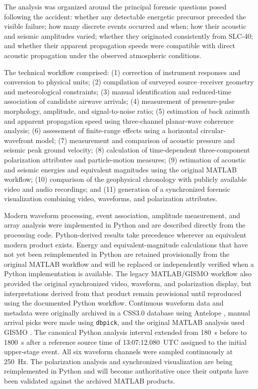 \documentclass[]{seismica}
\begin{document}
The analysis was organized around the principal forensic questions posed
following the accident: whether any detectable energetic precursor preceded
the visible failure; how many discrete events occurred and when; how their
acoustic and seismic amplitudes varied; whether they originated consistently
from SLC-40; and whether their apparent propagation speeds were compatible with
direct acoustic propagation under the observed atmospheric conditions.

The technical workflow comprised:
(1) correction of instrument responses and conversion to physical units;
(2) compilation of surveyed source--receiver geometry and meteorological
constraints;
(3) manual identification and reduced-time association of candidate airwave
arrivals;
(4) measurement of pressure-pulse morphology, amplitude, and signal-to-noise
ratio;
(5) estimation of back azimuth and apparent propagation speed using
three-channel planar-wave coherence analysis;
(6) assessment of finite-range effects using a horizontal circular-wavefront
model;
(7) measurement and comparison of acoustic pressure and seismic peak ground
velocity;
(8) calculation of time-dependent three-component polarization attributes and
particle-motion measures;
(9) estimation of acoustic and seismic energies and equivalent magnitudes
using the original MATLAB workflow;
(10) comparison of the geophysical chronology with publicly available video
and audio recordings; and
(11) generation of a synchronized forensic visualization combining video,
waveforms, and polarization attributes.

Modern waveform processing, event association, amplitude measurement, and
array analysis were implemented in Python and are described directly from the
processing code. Python-derived results take precedence wherever an equivalent
modern product exists. Energy and equivalent-magnitude calculations that have
not yet been reimplemented in Python are retained provisionally from the
original MATLAB workflow and will be replaced or independently verified when a
Python implementation is available. The legacy MATLAB/GISMO workflow also
provided the original synchronized video, waveform, and polarization display,
but interpretations derived from that product remain provisional until
reproduced using the documented Python workflow. Continuous waveform data and
metadata were originally archived in a CSS3.0 database using Antelope
\citep{brtt_antelope}, manual arrival picks were made using
\texttt{dbpick}, and the original MATLAB analysis used GISMO
\citep{thompson_gismo_2017}. The canonical Python analysis interval extended from 180~s
before to 1800~s after a reference source time of 13:07:12.080~UTC assigned to
the initial upper-stage event. All six waveform channels were sampled
continuously at 250~Hz. The polarization analysis and synchronized visualization are being
reimplemented in Python and will become authoritative once their outputs have
been validated against the archived MATLAB products.
\end{document}
